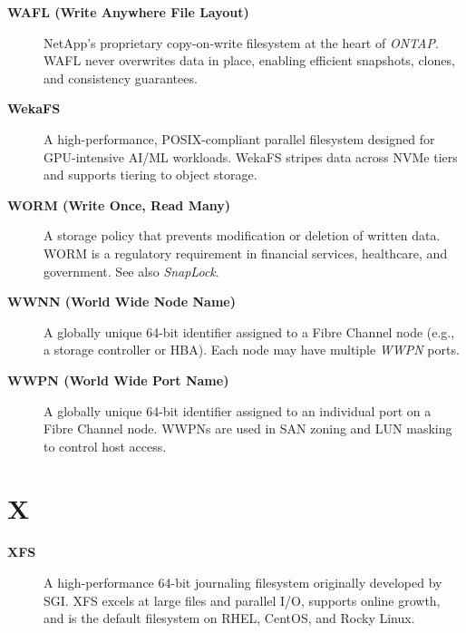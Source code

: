 \begin{description}

\item[\textbf{WAFL (Write Anywhere File Layout)}]
NetApp's proprietary copy-on-write filesystem at the heart of
\textit{ONTAP}. WAFL never overwrites data in place, enabling efficient
snapshots, clones, and consistency guarantees.

\item[\textbf{WekaFS}]
A high-performance, POSIX-compliant parallel filesystem designed for
GPU-intensive AI/ML workloads. WekaFS stripes data across NVMe tiers and
supports tiering to object storage.

\item[\textbf{WORM (Write Once, Read Many)}]
A storage policy that prevents modification or deletion of written data.
WORM is a regulatory requirement in financial services, healthcare, and
government. See also \textit{SnapLock}.

\item[\textbf{WWNN (World Wide Node Name)}]
A globally unique 64-bit identifier assigned to a Fibre Channel node (e.g.,
a storage controller or HBA). Each node may have multiple \textit{WWPN}
ports.

\item[\textbf{WWPN (World Wide Port Name)}]
A globally unique 64-bit identifier assigned to an individual port on a
Fibre Channel node. WWPNs are used in SAN zoning and LUN masking to
control host access.

\end{description}

\section*{X}

\begin{description}

\item[\textbf{XFS}]
A high-performance 64-bit journaling filesystem originally developed by SGI.
XFS excels at large files and parallel I/O, supports online growth, and is
the default filesystem on RHEL, CentOS, and Rocky Linux.

\end{description}

